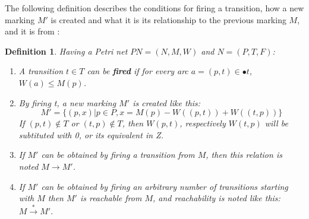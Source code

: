 \documentclass[12pt]{article}
\newtheorem{definition}{Definition}
\begin{document}
    The following definition describes the conditions for firing a transition, how a new marking $M'$ is created and what it is its relationship to the previous marking $M$, and it is from \cite{diaz2013petri}:
    \begin{definition}
        Having a Petri net \(PN=(N,M,W)\) and \(N=(P,T,F)\):  
        \begin{enumerate}
            \item A transition \(t \in T\) can be \textbf{fired} if for every arc \(a=(p,t) \in \bullet t\), \(W(a) \le M(p)\).
            \item By firing t, a new marking $M'$ is created like this: \begin{displaymath}M'=\{(p,x)|p \in P, x = M(p) - W((p,t)) + W((t,p))\}\end{displaymath}
            If \((p,t)\notin T\) or \((t,p)\notin T\), then \(W(p,t)\), respectively \(W(t,p)\) will be subtituted with 0, or its equivalent in Z.
            \item If $M'$ can be obtained by firing a transition from $M$, then this relation is noted \(M \rightarrow M'\). 
            \item If $M'$ can be obtained by firing an arbitrary number of transitions starting with $M$ then $M'$ is reachable from $M$, and reachability is noted like this: \(M \xrightarrow{*} M'\).
        \end{enumerate}
    \end{definition}
\end{document}
